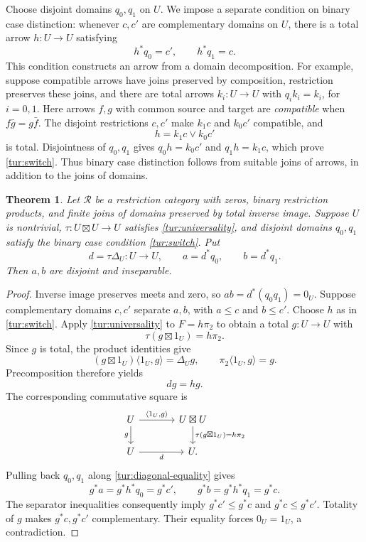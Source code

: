 \documentclass[11pt]{article}
\newtheorem{theorem}{Theorem}[section]
\theoremstyle{definition}
\theoremstyle{remark}
\newcommand{\R}{\mathscr R}
\begin{document}
Choose disjoint domains $q_0,q_1$ on $U$. We impose a separate condition
on binary case distinction: whenever $c,c'$ are complementary domains on
$U$, there is a total arrow $h:U\to U$ satisfying
\begin{equation}\label{tur:switch}
 h^*q_0=c',\qquad h^*q_1=c.
\end{equation}
This condition constructs an arrow from a domain decomposition. For
example, suppose compatible arrows have joins preserved by composition,
restriction preserves these joins, and there are total arrows
$k_i:U\to U$ with $q_i k_i=k_i$, for $i=0,1$. Here arrows $f,g$ with
common source and target are \emph{compatible} when
$f\bar g=g\bar f$. The disjoint restrictions $c,c'$ make $k_1c$ and
$k_0c'$ compatible, and
\[
 h=k_1c\vee k_0c'
\]
is total. Disjointness of $q_0,q_1$ gives
$q_0h=k_0c'$ and $q_1h=k_1c$, which prove
\eqref{tur:switch}. Thus binary case distinction follows from suitable
joins of arrows, in addition to the joins of domains.

\begin{theorem}\label{tur:inseparable}
Let $\R$ be a restriction category with zeros, binary restriction
products, and finite joins of domains preserved by total inverse image.
Suppose $U$ is nontrivial, $\tau:U\boxtimes U\to U$ satisfies
\eqref{tur:universality}, and disjoint domains $q_0,q_1$ satisfy the
binary case condition \eqref{tur:switch}. Put
\[
 d=\tau\Delta_U:U\longrightarrow U,\qquad
 a=d^*q_0,\qquad b=d^*q_1.
\]
Then $a,b$ are disjoint and inseparable.
\end{theorem}
\begin{proof}
Inverse image preserves meets and zero, so
$ab=d^*(q_0q_1)=0_U$. Suppose complementary domains $c,c'$ separate
$a,b$, with $a\le c$ and $b\le c'$. Choose $h$ as in
\eqref{tur:switch}. Apply \eqref{tur:universality} to
$F=h\pi_2$ to obtain a total $g:U\to U$ with
\[
 \tau(g\boxtimes1_U)=h\pi_2.
\]
Since $g$ is total, the product identities give
\[
 (g\boxtimes1_U)\langle1_U,g\rangle=\Delta_U g,
 \qquad \pi_2\langle1_U,g\rangle=g.
\]
Precomposition therefore yields
\begin{equation}\label{tur:diagonal-equality}
 dg=hg.
\end{equation}
The corresponding commutative square is
\[
\begin{tikzcd}[column sep=large]
 U \arrow[r,"{\langle1_U,g\rangle}"] \arrow[d,"g"'] &
 U\boxtimes U \arrow[d,"\tau(g\boxtimes1_U)=h\pi_2"]\\
 U \arrow[r,"d"'] & U.
\end{tikzcd}
\]
Pulling back $q_0,q_1$ along \eqref{tur:diagonal-equality} gives
\[
 g^*a=g^*h^*q_0=g^*c',\qquad
 g^*b=g^*h^*q_1=g^*c.
\]
The separator inequalities consequently imply
$g^*c'\le g^*c$ and $g^*c\le g^*c'$. Totality of $g$ makes
$g^*c,g^*c'$ complementary. Their equality forces $0_U=1_U$,
a contradiction.
\end{proof}
\end{document}
